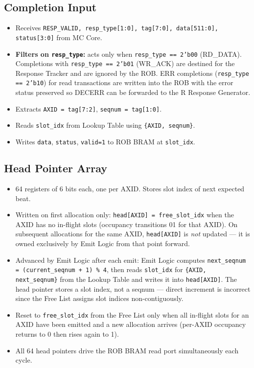 \subsection{Completion Input}
\begin{itemize}[noitemsep]
  \item Receives \texttt{RESP\_VALID, resp\_type[1:0], tag[7:0], data[511:0], status[3:0]}
        from MC Core.
  \item \textbf{Filters on \texttt{resp\_type}:} acts only when
        \texttt{resp\_type == 2'b00} (RD\_DATA). Completions with
        \texttt{resp\_type == 2'b01} (WR\_ACK) are destined for the Response Tracker
        and are ignored by the ROB. ERR completions (\texttt{resp\_type == 2'b10}) for
        read transactions are written into the ROB with the error status preserved so
        DECERR can be forwarded to the R Response Generator.
  \item Extracts \texttt{AXID = tag[7:2]}, \texttt{seqnum = tag[1:0]}.
  \item Reads \texttt{slot\_idx} from Lookup Table using \texttt{\{AXID, seqnum\}}.
  \item Writes \texttt{data}, \texttt{status}, \texttt{valid=1} to ROB BRAM at \texttt{slot\_idx}.
\end{itemize}

\subsection{Head Pointer Array}
\begin{itemize}[noitemsep]
  \item 64 registers of 6 bits each, one per AXID. Stores slot index of next expected beat.
  \item Written on first allocation only: \texttt{head[AXID] = free\_slot\_idx} when the
        AXID has no in-flight slots (occupancy transitions 0\textrightarrow{}1 for that AXID).
        On subsequent allocations for the same AXID, \texttt{head[AXID]} is \emph{not} updated
        — it is owned exclusively by Emit Logic from that point forward.
  \item Advanced by Emit Logic after each emit: Emit Logic computes
        \texttt{next\_seqnum = (current\_seqnum + 1) \% 4}, then reads
        \texttt{slot\_idx} for \texttt{\{AXID, next\_seqnum\}} from the Lookup Table
        and writes it into \texttt{head[AXID]}. The head pointer stores a slot index,
        not a seqnum — direct increment is incorrect since the Free List assigns slot
        indices non-contiguously.
  \item Reset to \texttt{free\_slot\_idx} from the Free List only when all in-flight slots
        for an AXID have been emitted and a new allocation arrives (per-AXID occupancy
        returns to 0 then rises again to 1).
  \item All 64 head pointers drive the ROB BRAM read port simultaneously each cycle.
\end{itemize}

